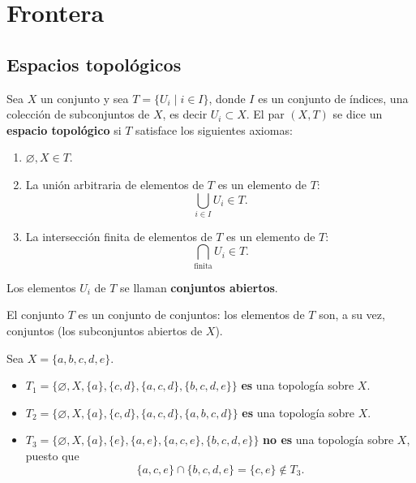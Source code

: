 \chapter{Frontera}

\section{Espacios topológicos}

\begin{definicion}
Sea $X$ un conjunto y sea $T = \{U_i \mid i \in I\}$, donde $I$ es un
conjunto de índices, una colección de subconjuntos de $X$, es decir
$U_i \subset X$. El par $(X,T)$ se dice un \textbf{espacio topológico} si
$T$ satisface los siguientes axiomas:
\begin{enumerate}[label=\roman*)]
\item $\varnothing, X \in T$.
\item La unión arbitraria de elementos de $T$ es un elemento de $T$:
\[
\bigcup_{i\in I} U_i \in T .
\]
\item La intersección finita de elementos de $T$ es un elemento de $T$:
\[
\bigcap_{\text{finita}} U_i \in T .
\]
\end{enumerate}
Los elementos $U_i$ de $T$ se llaman \textbf{conjuntos abiertos}.
\end{definicion}

\begin{observacion}
El conjunto $T$ es un conjunto de conjuntos: los elementos de $T$ son, a su
vez, conjuntos (los subconjuntos abiertos de $X$).
\end{observacion}

\begin{ejemplo}
Sea $X = \{a,b,c,d,e\}$.
\begin{itemize}
\item $T_1 = \{\varnothing, X, \{a\}, \{c,d\}, \{a,c,d\}, \{b,c,d,e\}\}$
\textbf{es} una topología sobre $X$.
\item $T_2 = \{\varnothing, X, \{a\}, \{c,d\}, \{a,c,d\}, \{a,b,c,d\}\}$
\textbf{es} una topología sobre $X$.
\item $T_3 = \{\varnothing, X, \{a\}, \{e\}, \{a,e\}, \{a,c,e\},
\{b,c,d,e\}\}$ \textbf{no es} una topología sobre $X$, puesto que
\[
\{a,c,e\} \cap \{b,c,d,e\} = \{c,e\} \notin T_3 .
\]
\end{itemize}
\end{ejemplo}

